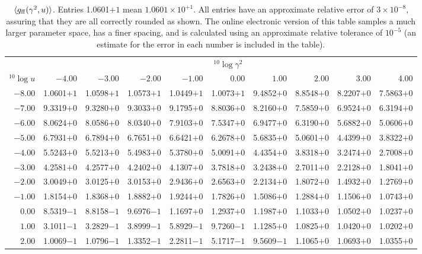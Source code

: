 \documentclass[useAMS,usenatbib]{mn2e}
\begin{document}
\begin{table}
\caption{$\langle g_{\rm ff}(\gamma^2,u)\rangle$. Entries 1.0601$+1$ mean
  $1.0601 \times 10^{+1}$. All entries have an approximate relative error of
  $3\times10^{-8}$, assuring that they are all correctly rounded as shown. The
  online electronic version of this table samples a much larger parameter
  space, has a finer spacing, and is calculated using an approximate relative
  tolerance of $10^{-5}$ (an estimate for the error in each number is included
  in the table).\label{av}}
\begin{tabular}{rrrrrrrrrr}
\hline
   & \multicolumn{9}{c}{${}^{10}\log \gamma^2$} \\
${}^{10}\log u$ & $-4.00$ & $-3.00$ &   $-2.00$ &    $-1.00$ &     $0.00$ &     $1.00$ &     $2.00$ &     $3.00$ &       4.00 \\
\hline
$-8.00$ & 1.0601$+1$ & 1.0598$+1$ & 1.0573$+1$ & 1.0449$+1$ & 1.0073$+1$ & 9.4852$+0$ & 8.8548$+0$ & 8.2207$+0$ & 7.5863$+0$ \\
$-7.00$ & 9.3319$+0$ & 9.3280$+0$ & 9.3033$+0$ & 9.1795$+0$ & 8.8036$+0$ & 8.2160$+0$ & 7.5859$+0$ & 6.9524$+0$ & 6.3194$+0$ \\
$-6.00$ & 8.0624$+0$ & 8.0586$+0$ & 8.0340$+0$ & 7.9103$+0$ & 7.5347$+0$ & 6.9477$+0$ & 6.3190$+0$ & 5.6882$+0$ & 5.0606$+0$ \\
$-5.00$ & 6.7931$+0$ & 6.7894$+0$ & 6.7651$+0$ & 6.6421$+0$ & 6.2678$+0$ & 5.6835$+0$ & 5.0601$+0$ & 4.4399$+0$ & 3.8322$+0$ \\
$-4.00$ & 5.5243$+0$ & 5.5213$+0$ & 5.4983$+0$ & 5.3780$+0$ & 5.0091$+0$ & 4.4354$+0$ & 3.8318$+0$ & 3.2474$+0$ & 2.7008$+0$ \\
$-3.00$ & 4.2581$+0$ & 4.2577$+0$ & 4.2402$+0$ & 4.1307$+0$ & 3.7818$+0$ & 3.2438$+0$ & 2.7011$+0$ & 2.2128$+0$ & 1.8041$+0$ \\
$-2.00$ & 3.0049$+0$ & 3.0125$+0$ & 3.0153$+0$ & 2.9436$+0$ & 2.6563$+0$ & 2.2134$+0$ & 1.8072$+0$ & 1.4932$+0$ & 1.2769$+0$ \\
$-1.00$ & 1.8154$+0$ & 1.8368$+0$ & 1.8882$+0$ & 1.9244$+0$ & 1.7826$+0$ & 1.5086$+0$ & 1.2884$+0$ & 1.1506$+0$ & 1.0743$+0$ \\
$ 0.00$ & 8.5319$-1$ & 8.8158$-1$ & 9.6976$-1$ & 1.1697$+0$ & 1.2937$+0$ & 1.1987$+0$ & 1.1033$+0$ & 1.0502$+0$ & 1.0237$+0$ \\
$ 1.00$ & 3.1011$-1$ & 3.2829$-1$ & 3.8999$-1$ & 5.8929$-1$ & 9.7260$-1$ & 1.1285$+0$ & 1.0825$+0$ & 1.0420$+0$ & 1.0202$+0$ \\
$ 2.00$ & 1.0069$-1$ & 1.0796$-1$ & 1.3352$-1$ & 2.2811$-1$ & 5.1717$-1$ & 9.5609$-1$ & 1.1065$+0$ & 1.0693$+0$ & 1.0355$+0$ \\

\end{tabular}
\end{table}
\end{document}
